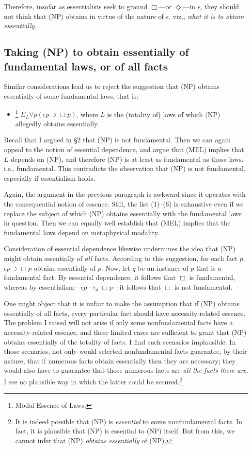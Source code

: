 \documentclass[12pt]{article}
\begin{document}
\par
Therefore, insofar as essentialists seek to ground $\Box$---or $\Diamond$---in $\epsilon$, they should not think that (NP) obtains in virtue of the nature of $\epsilon$, viz., \textit{what it is to obtain essentially}. 

\subsection{Taking (NP) to obtain essentially of fundamental laws, or of all facts}

Similar considerations lead us to reject the suggestion that (NP) obtains essentially of some fundamental laws, that is:
\begin{itemize}
    \item[(MEL)]\footnote{Modal Essence of Laws.} $E_L \forall p(\epsilon p \supset \Box p)$, where $L$ is the (totality of) laws of which (NP) allegedly obtains essentially.
\end{itemize}
Recall that I argued in \S2 that (NP) is not fundamental. Then we can again appeal to the notion of essential dependence, and argue that (MEL) implies that $L$ depends on (NP), and therefore (NP) is at least as fundamental as those laws, i.e., fundamental. This contradicts the observation that (NP) is not fundamental, especially if essentialism holds. 
\par
Again, the argument in the previous paragraph is awkward since it operates with the consequential notion of essence. Still, the list (1)--(6) is exhaustive even if we replace the subject of which (NP) obtains essentially with the fundamental laws in question. Then we can equally well establish that (MEL) implies that the fundamental laws depend on metaphysical modality.
\par
Consideration of essential dependence likewise undermines the idea that (NP) might obtain essentially of \textit{all} facts. According to this suggestion, for each fact $p$, $\epsilon p \supset \Box p$ obtains essentially of $p$. Now, let $q$ be an instance of $p$ that is a fundamental fact. By essential dependence, it follows that $\Box$ is fundamental, whereas by essentialism---$\epsilon p \bm{\rightarrow}_p \Box p$---it follows that $\Box$ is not fundamental. 
\par
One might object that it is unfair to make the assumption that if (NP) obtains essentially of all facts, every particular fact should have necessity-related essence. The problem I raised will not arise if only some nonfundamental facts have a necessity-related essence, and these limited cases are sufficient to grant that (NP) obtains essentially of the totality of facts. I find such scenarios implausible. In those scenarios, not only would selected nonfundamental facts guarantee, by their nature, that if numerous facts obtain essentially then they are necessary; they would also have to guarantee that those numerous facts are \textit{all the facts there are}. I see no plausible way in which the latter could be secured.\footnote{It is indeed possible that (NP) is \textit{essential} to some nonfundamental facts. In fact, it is plausible that (NP) is essential to (NP) itself. But from this, we cannot infer that (NP) \textit{obtains essentially} of (NP).}  
\end{document}
